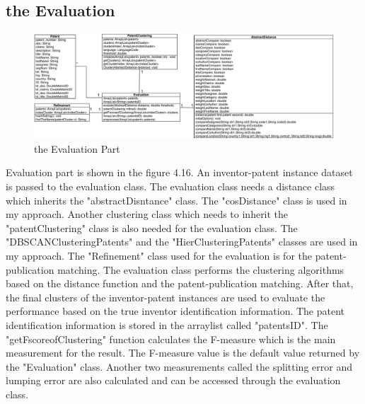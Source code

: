 \subsection{the Evaluation}
 \begin{figure}
\centering
\includegraphics[width=\headwidth]{evaluation.pdf}
\caption{the Evaluation Part}
\end{figure}
Evaluation part is shown in the figure 4.16. An inventor-patent instance dataset is passed to the evaluation class. The evaluation class needs a distance class which inherits the "abstractDisntance" class. The "cosDistance" class is used in my approach. Another clustering class which needs to inherit the "patentClustering" class is also needed for the evaluation class. The "DBSCANClusteringPatents" and the "HierClusteringPatents" classes are used in my approach. The "Refinement" class  used for the evaluation is for the patent-publication matching. The evaluation class performs the clustering algorithms based on the distance function and the patent-publication matching. After that, the final clusters of the inventor-patent instances are used to evaluate the performance based on the true inventor identification information. The patent identification information is stored in the arraylist called "patentsID". The "getFscoreofClustering" function calculates the F-measure which is the main measurement for the result. The F-measure value is the default value returned by the "Evaluation" class. Another two measurements called the splitting error and lumping error are also calculated and can be accessed through the evaluation class.
 
